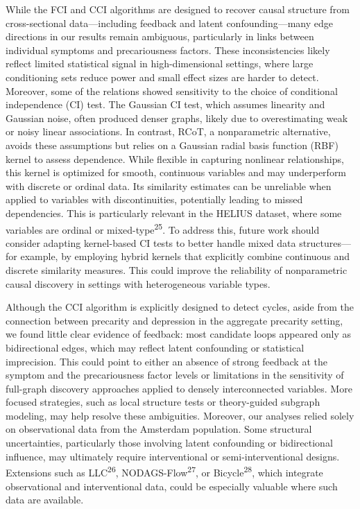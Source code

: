 \documentclass[
]{article}
\begin{document}
While the FCI and CCI algorithms are designed to recover causal
structure from cross-sectional data---including feedback and latent
confounding---many edge directions in our results remain ambiguous,
particularly in links between individual symptoms and precariousness
factors. These inconsistencies likely reflect limited statistical signal
in high-dimensional settings, where large conditioning sets reduce power
and small effect sizes are harder to detect. Moreover, some of the
relations showed sensitivity to the choice of conditional independence
(CI) test. The Gaussian CI test, which assumes linearity and Gaussian
noise, often produced denser graphs, likely due to overestimating weak
or noisy linear associations. In contrast, RCoT, a nonparametric
alternative, avoids these assumptions but relies on a Gaussian radial
basis function (RBF) kernel to assess dependence. While flexible in
capturing nonlinear relationships, this kernel is optimized for smooth,
continuous variables and may underperform with discrete or ordinal data.
Its similarity estimates can be unreliable when applied to variables
with discontinuities, potentially leading to missed dependencies. This
is particularly relevant in the HELIUS dataset, where some variables are
ordinal or mixed-type\textsuperscript{25}. To address this, future work
should consider adapting kernel-based CI tests to better handle mixed
data structures---for example, by employing hybrid kernels that
explicitly combine continuous and discrete similarity measures. This
could improve the reliability of nonparametric causal discovery in
settings with heterogeneous variable types.

Although the CCI algorithm is explicitly designed to detect cycles,
aside from the connection between precarity and depression in the
aggregate precarity setting, we found little clear evidence of feedback:
most candidate loops appeared only as bidirectional edges, which may
reflect latent confounding or statistical imprecision. This could point
to either an absence of strong feedback at the symptom and the
precariousness factor levels or limitations in the sensitivity of
full-graph discovery approaches applied to densely interconnected
variables. More focused strategies, such as local structure tests or
theory-guided subgraph modeling, may help resolve these ambiguities.
Moreover, our analyses relied solely on observational data from the
Amsterdam population. Some structural uncertainties, particularly those
involving latent confounding or bidirectional influence, may ultimately
require interventional or semi-interventional designs. Extensions such
as LLC\textsuperscript{26}, NODAGS-Flow\textsuperscript{27}, or
Bicycle\textsuperscript{28}, which integrate observational and
interventional data, could be especially valuable where such data are
available.
\end{document}
